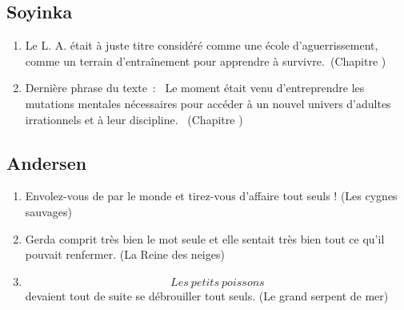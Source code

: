 \documentclass[a4paper, 11pt, hidelinks]{article}
\newcommand{\rb}[1]{\Romanbar{#1}}
\begin{document}
\subsection{Soyinka}


\begin{enumerate}
    \item Le L. A. était à juste titre considéré comme une école d'aguerrissement, comme un terrain d'entraînement pour apprendre à survivre. (Chapitre \rb{12}) 
    \item Dernière phrase du texte : \og Le moment était venu d'entreprendre les mutations mentales nécessaires pour accéder à un nouvel univers d'adultes irrationnels et à leur discipline. \fg (Chapitre \rb{15})
\end{enumerate}




\subsection{Andersen}


\begin{enumerate}
    \item Envolez-vous de par le monde et tirez-vous d'affaire tout seuls ! (Les cygnes sauvages)
    \item Gerda comprit très bien le mot \og seule \fg et elle sentait très bien tout ce qu'il pouvait renfermer. (La Reine des neiges)
    \item \[Les \ petits \ poissons\] devaient tout de suite se débrouiller tout seuls. (Le grand serpent de mer)
\end{enumerate}
\end{document}
